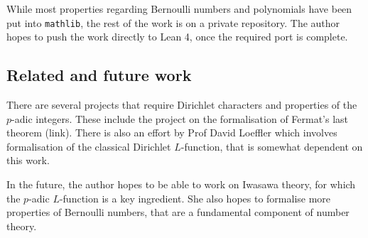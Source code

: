 \documentclass[a4paper,UKenglish,cleveref, autoref, thm-restate]{lipics-v2021}
\newcommand{\lean}[1]{\texttt{#1}\xspace} %
\begin{document}
While most properties regarding Bernoulli numbers and polynomials have been put into \lean{mathlib}, the rest of the work is on a private repository. The author hopes to push the 
work directly to Lean 4, once the required port is complete.

\subsection{Related and future work} %
There are several projects that require Dirichlet characters and properties of the $p$-adic integers. These include the project on the formalisation of Fermat's last theorem (link). 
There is also an effort by Prof David Loeffler which involves formalisation of the classical Dirichlet $L$-function, that is somewhat dependent on this work. 

In the future, the author hopes to be able to work on Iwasawa theory, for which the $p$-adic $L$-function is a key ingredient. She also hopes to formalise more properties of Bernoulli numbers, 
that are a fundamental component of number theory.


\end{document}
